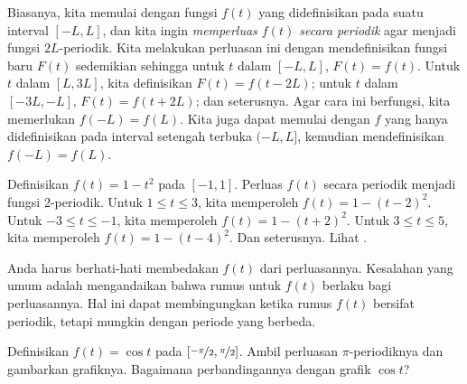 Biasanya, kita memulai dengan fungsi $f(t)$ yang didefinisikan pada suatu interval $[-L,L]$,
dan kita ingin
\emph{memperluas $f(t)$ secara periodik}
agar menjadi
fungsi $2L$-periodik.  Kita melakukan perluasan ini
dengan mendefinisikan fungsi baru $F(t)$
sedemikian sehingga untuk $t$ dalam $[-L,L]$, $F(t) = f(t)$.  Untuk $t$ dalam $[L,3L]$,
kita definisikan $F(t) = f(t-2L)$; untuk $t$ dalam $[-3L,-L]$, $F(t) = f(t+2L)$; dan
seterusnya.
Agar cara ini berfungsi, kita memerlukan $f(-L) = f(L)$.
Kita juga dapat memulai dengan $f$
yang hanya didefinisikan pada interval setengah terbuka $(-L,L]$, kemudian mendefinisikan $f(-L) = f(L)$.

\begin{example}
Definisikan $f(t) = 1-t^2$ pada $[-1,1]$.  Perluas $f(t)$ secara periodik menjadi
fungsi 2-periodik.
Untuk $1 \leq t \leq 3$, kita memperoleh
$f(t) = 1-{(t-2)}^2$.
Untuk $-3 \leq t \leq -1$, kita memperoleh
$f(t) = 1-{(t+2)}^2$.
Untuk $3 \leq t \leq 5$, kita memperoleh
$f(t) = 1-{(t-4)}^2$.  Dan seterusnya.
Lihat .
\begin{myfig}
\capstart
{}
\caption{Perluasan periodik fungsi
$1-t^2$.\label{ts:perextofinvertedparabolafig}}
\end{myfig}
\end{example}

Anda harus berhati-hati membedakan $f(t)$ dari perluasannya.  Kesalahan yang umum
adalah mengandaikan bahwa rumus untuk $f(t)$ berlaku bagi perluasannya.  Hal ini
dapat membingungkan ketika rumus $f(t)$ bersifat periodik, tetapi mungkin dengan
periode yang berbeda.

\begin{exercise}
Definisikan $f(t) = \cos t$ pada $[\nicefrac{-\pi}{2},\nicefrac{\pi}{2}]$.  Ambil perluasan
$\pi$-periodiknya dan gambarkan grafiknya.  Bagaimana perbandingannya dengan grafik
$\cos t$?
\end{exercise}

